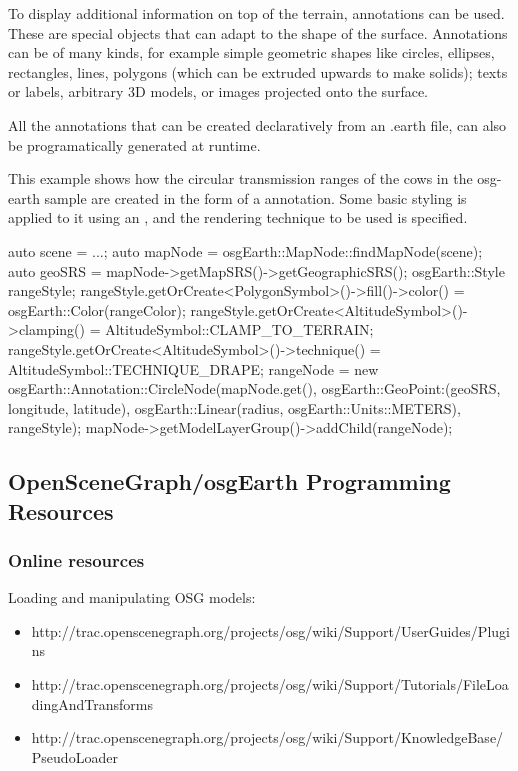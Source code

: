 To display additional information on top of the terrain, annotations can be
used. These are special objects that can adapt to the shape of the surface.
Annotations can be of many kinds, for example simple geometric shapes like circles,
ellipses, rectangles, lines, polygons (which can be extruded upwards to make
solids); texts or labels, arbitrary 3D models, or images projected onto the
surface.

All the annotations that can be created declaratively from an .earth file,
can also be programatically generated at runtime.

This example shows how the circular transmission ranges of the cows in the
osg-earth sample are created in the form of a
 annotation. Some basic styling is
applied to it using an , and the rendering technique to
be used is specified.

\begin{cpp}
auto scene = ...;
auto mapNode = osgEarth::MapNode::findMapNode(scene);
auto geoSRS = mapNode->getMapSRS()->getGeographicSRS();
osgEarth::Style rangeStyle;
rangeStyle.getOrCreate<PolygonSymbol>()->fill()->color() =
                                        osgEarth::Color(rangeColor);
rangeStyle.getOrCreate<AltitudeSymbol>()->clamping() =
                                        AltitudeSymbol::CLAMP_TO_TERRAIN;
rangeStyle.getOrCreate<AltitudeSymbol>()->technique() =
                                        AltitudeSymbol::TECHNIQUE_DRAPE;
rangeNode = new osgEarth::Annotation::CircleNode(mapNode.get(),
    osgEarth::GeoPoint:(geoSRS, longitude, latitude),
    osgEarth::Linear(radius, osgEarth::Units::METERS), rangeStyle);
mapNode->getModelLayerGroup()->addChild(rangeNode);
\end{cpp}


\subsection{OpenSceneGraph/osgEarth Programming Resources}
\label{sec:graphics:osg-osgearth-programming-resources}

\subsubsection{Online resources}
\label{sec:graphics:osg-osgearth-online-resources}

Loading and manipulating OSG models:
\begin{itemize}
\item http://trac.openscenegraph.org/projects/osg/wiki/Support/UserGuides/Plugins
\item http://trac.openscenegraph.org/projects/osg/wiki/Support/Tutorials/FileLoadingAndTransforms
\item http://trac.openscenegraph.org/projects/osg/wiki/Support/KnowledgeBase/PseudoLoader
\end{itemize}

